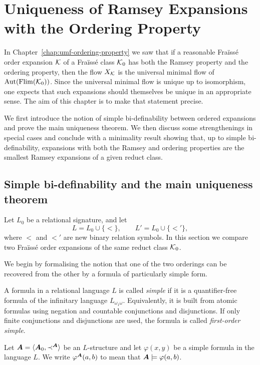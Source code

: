 \chapter[Uniqueness of Ramsey Expansions]{Uniqueness of Ramsey Expansions with the Ordering Property}
\label{chap:uniqueness-ramsey-expansions}

In Chapter~\ref{chap:umf-ordering-property} we saw that if a reasonable Fraïssé order expansion \(\mathcal{K}\) of a Fraïssé class \(\mathcal{K}_0\) has both the Ramsey property and the ordering property, then the flow \(X_{\mathcal{K}}\) is the universal minimal flow of \(\operatorname{Aut}(\operatorname{Flim}(\mathcal{K}_0))\). Since the universal minimal flow is unique up to isomorphism, one expects that such expansions should themselves be unique in an appropriate sense. The aim of this chapter is to make that statement precise.

We first introduce the notion of simple bi-definability between ordered expansions and prove the main uniqueness theorem. We then discuss some strengthenings in special cases and conclude with a minimality result showing that, up to simple bi-definability, expansions with both the Ramsey and ordering properties are the smallest Ramsey expansions of a given reduct class.

\section{Simple bi-definability and the main uniqueness theorem}

Let \(L_0\) be a relational signature, and let
\[
    L=L_0\cup\{<\},
    \qquad
    L'=L_0\cup\{<'\},
\]
where \(<\) and \(<'\) are new binary relation symbols. In this section we compare
two Fraïssé order expansions of the same reduct class \(\mathcal{K}_0\).

We begin by formalising the notion that one of the two orderings can be recovered from the other by a formula of particularly simple form.

\begin{definition}
    A formula in a relational language \(L\) is called \emph{simple} if it is a
    quantifier-free formula of the infinitary language \(L_{\omega_1\omega}\).
    Equivalently, it is built from atomic formulas using negation and countable
    conjunctions and disjunctions. If only finite conjunctions and
    disjunctions are used, the formula is called \emph{first-order simple}.

    Let \(\boldsymbol{A}=\langle \boldsymbol{A}_0,\prec^{\boldsymbol{A}}\rangle\) be an \(L\)-structure and let
    \(\varphi(x,y)\) be a simple formula in the language \(L\). We write
    \(\varphi^{\boldsymbol{A}}(a,b)\)
    to mean that \(\boldsymbol{A}\models \varphi(a,b)\).
\end{definition}

